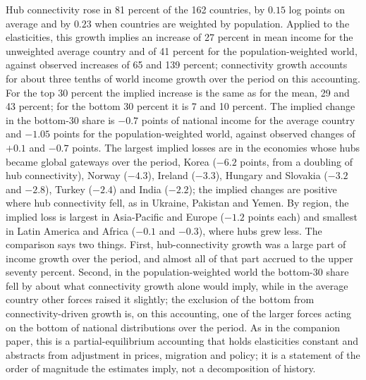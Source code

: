 Hub connectivity rose in 81 percent of the 162 countries, by $0.15$ log points on average and by $0.23$ when countries are weighted by population. Applied to the elasticities, this growth implies an increase of 27 percent in mean income for the unweighted average country and of 41 percent for the population-weighted world, against observed increases of 65 and 139 percent; connectivity growth accounts for about three tenths of world income growth over the period on this accounting. For the top 30 percent the implied increase is the same as for the mean, 29 and 43 percent; for the bottom 30 percent it is 7 and 10 percent. The implied change in the bottom-30 share is $-0.7$ points of national income for the average country and $-1.05$ points for the population-weighted world, against observed changes of $+0.1$ and $-0.7$ points. The largest implied losses are in the economies whose hubs became global gateways over the period, Korea ($-6.2$ points, from a doubling of hub connectivity), Norway ($-4.3$), Ireland ($-3.3$), Hungary and Slovakia ($-3.2$ and $-2.8$), Turkey ($-2.4$) and India ($-2.2$); the implied changes are positive where hub connectivity fell, as in Ukraine, Pakistan and Yemen. By region, the implied loss is largest in Asia-Pacific and Europe ($-1.2$ points each) and smallest in Latin America and Africa ($-0.1$ and $-0.3$), where hubs grew less. The comparison says two things. First, hub-connectivity growth was a large part of income growth over the period, and almost all of that part accrued to the upper seventy percent. Second, in the population-weighted world the bottom-30 share fell by about what connectivity growth alone would imply, while in the average country other forces raised it slightly; the exclusion of the bottom from connectivity-driven growth is, on this accounting, one of the larger forces acting on the bottom of national distributions over the period. As in the companion paper, this is a partial-equilibrium accounting that holds elasticities constant and abstracts from adjustment in prices, migration and policy; it is a statement of the order of magnitude the estimates imply, not a decomposition of history.

